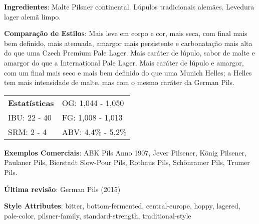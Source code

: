 \textbf{Ingredientes}: Malte Pilsner continental. Lúpulos tradicionais alemães. Levedura lager alemã limpo.

\textbf{Comparação de Estilos}: Mais leve em corpo e cor, mais seca, com final mais bem definido, mais atenuada, amargor mais persistente e carbonatação mais alta do que uma Czech Premium Pale Lager. Mais caráter de lúpulo, sabor de malte e amargor do que a International Pale Lager. Mais caráter de lúpulo e amargor, com um final mais seco e mais bem definido do que uma Munich Helles; a Helles tem mais intensidade de malte, mas com o mesmo caráter da German Pils.

\begin{tabular}{@{}p{35mm}p{35mm}@{}}
  \textbf{Estatísticas} & OG: 1,044 - 1,050 \\
  IBU: 22 - 40  & FG: 1,008 - 1,013  \\
  SRM: 2 - 4  & ABV: 4,4\% - 5,2\%
\end{tabular}

\textbf{Exemplos Comerciais}: ABK Pils Anno 1907, Jever Pilsener, König Pilsener, Paulaner Pils, Bierstadt Slow-Pour Pils, Rothaus Pils, Schönramer Pils, Trumer Pils.

\textbf{Última revisão}: German Pils (2015)

\textbf{Style Attributes}: bitter, bottom-fermented, central-europe, hoppy, lagered, pale-color, pilsner-family, standard-strength, traditional-style

